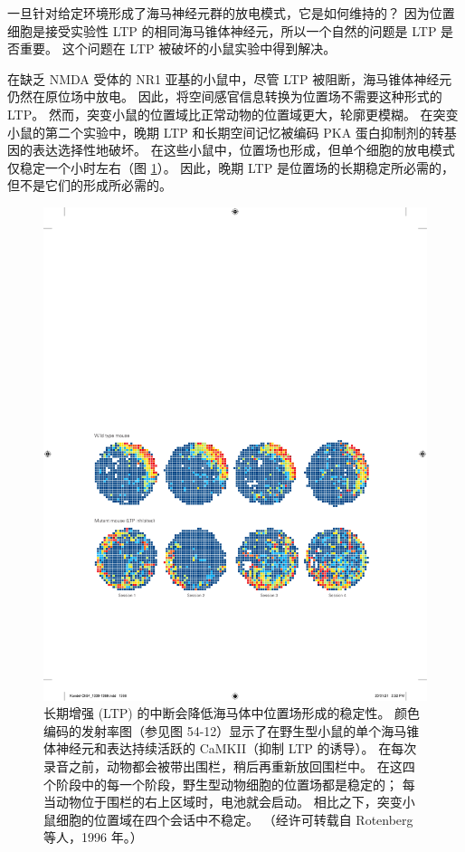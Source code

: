 一旦针对给定环境形成了海马神经元群的放电模式，它是如何维持的？ 因为位置细胞是接受实验性 LTP 的相同海马锥体神经元，所以一个自然的问题是 LTP 是否重要。 这个问题在 LTP 被破坏的小鼠实验中得到解决。

在缺乏 NMDA 受体的 NR1 亚基的小鼠中，尽管 LTP 被阻断，海马锥体神经元仍然在原位场中放电。 因此，将空间感官信息转换为位置场不需要这种形式的 LTP。 然而，突变小鼠的位置域比正常动物的位置域更大，轮廓更模糊。 在突变小鼠的第二个实验中，晚期 LTP 和长期空间记忆被编码 PKA 蛋白抑制剂的转基因的表达选择性地破坏。 在这些小鼠中，位置场也形成，但单个细胞的放电模式仅稳定一个小时左右（图 \ref{fig:54_16}）。 因此，晚期 LTP 是位置场的长期稳定所必需的，但不是它们的形成所必需的。

\begin{figure}[htbp]
	\centering
	\includegraphics[width=0.9\linewidth]{chap54/fig_54_16}
	\caption{长期增强 (LTP) 的中断会降低海马体中位置场形成的稳定性。 颜色编码的发射率图（参见图 54-12）显示了在野生型小鼠的单个海马锥体神经元和表达持续活跃的 CaMKII（抑制 LTP 的诱导）。 在每次录音之前，动物都会被带出围栏，稍后再重新放回围栏中。 在这四个阶段中的每一个阶段，野生型动物细胞的位置场都是稳定的； 每当动物位于围栏的右上区域时，电池就会启动。 相比之下，突变小鼠细胞的位置域在四个会话中不稳定。 （经许可转载自 Rotenberg 等人，1996 年。）}
	\label{fig:54_16}
\end{figure}

